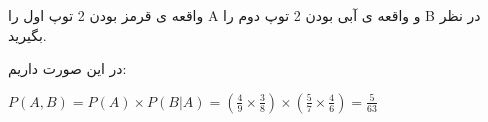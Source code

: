 واقعه ی قرمز بودن 2 توپ اول را A 
و واقعه ی آبی بودن 2 توپ دوم را B 
در نظر بگیرید.

در این صورت داریم:

$P(A, B) = P(A) \times P(B|A) = (\frac{4}{9} \times \frac{3}{8}) \times (\frac{5}{7} \times \frac{4}{6}) = \frac{5}{63}$
